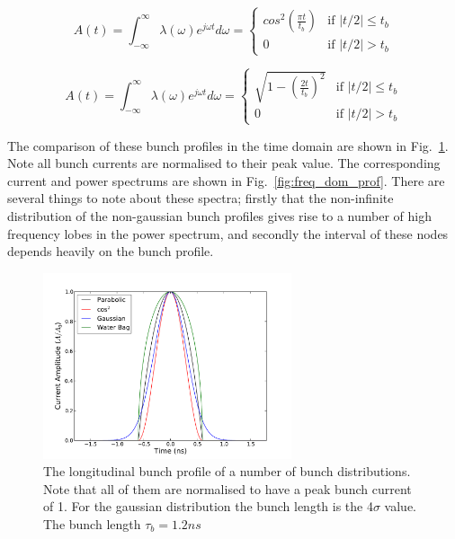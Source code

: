 \begin{equation}
A\left( t \right) = \int^{\infty}_{-\infty} \lambda \left( \omega \right) e^{j\omega t} d\omega = 
\begin{cases}
cos^{2}\left( \frac{\pi t} {t_{b}} \right) &\textrm{if $| t/2 | \leq t_{b}$}\\
0								&\textrm{if $| t/2 | > t_{b}$}
\end{cases}
\label{eqn:cos_profile}
\end{equation}

\begin{equation}
A\left( t \right) = \int^{\infty}_{-\infty} \lambda \left( \omega \right) e^{j\omega t} d\omega = 
\begin{cases}
\sqrt{1-\left( \frac{2t}{t_{b}}\right)^{2}} &\textrm{if $| t/2 | \leq t_{b}$}\\
0								&\textrm{if $| t/2 | > t_{b}$}
\end{cases}
\label{eqn:water_bag_profile}
\end{equation}

The comparison of these bunch profiles in the time domain are shown in Fig.~\ref{fig:time_bunch_profiles}. Note all bunch currents are normalised to their peak value. The corresponding current and power spectrums are shown in Fig.~\ref{fig:freq_dom_prof}. There are several things to note about these spectra; firstly that the non-infinite distribution of the non-gaussian bunch profiles gives rise to a number of high frequency lobes in the power spectrum, and secondly the interval of these nodes depends heavily on the bunch profile.

\begin{figure}
\begin{center}
\includegraphics[width=0.65\textwidth]{Wakefields_and_Impedances/figures/bunch_profile_12ns.pdf}
\end{center}
\label{fig:time_bunch_profiles}
\caption{The longitudinal bunch profile of a number of bunch distributions. Note that all of them are normalised to have a peak bunch current of 1. For the gaussian distribution the bunch length is the 4$\sigma$ value. The bunch length $\tau_{b} = 1.2ns$}
\end{figure}

